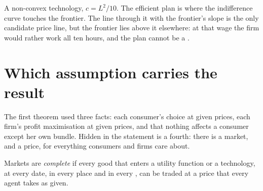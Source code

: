 \begin{omfigure}

{\small A non-convex technology, $c = L^2/10$. The efficient plan is where the indifference curve touches
the frontier. The line through it with the frontier's slope is the only candidate price line, but the
frontier lies above it elsewhere: at that wage the firm would rather work all ten hours, and the plan
cannot be a .}
\end{omfigure}

\section{Which assumption carries the result}\label{sec:b2:welfare-theorems:assumptions}

The first theorem used three facts: each consumer's choice at given prices, each firm's profit
maximisation at given prices, and that nothing affects a consumer except her own bundle. Hidden in the
statement is a fourth: there is a market, and a price, for everything consumers and firms care about.

\begin{definition}\label{def:b2:welfare-theorems:complete-markets}
Markets are \emph{complete} if every good that enters a utility function or a
technology, at every date, in every place and in every , can be traded at a price that
every agent takes as given.
\end{definition}

